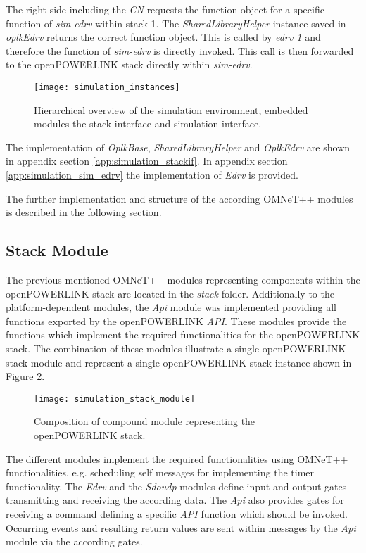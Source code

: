 The right side including the \emph{CN} requests the function object for a specific function of \emph{sim-edrv} within stack 1.
The \emph{SharedLibraryHelper} instance saved in \emph{oplkEdrv} returns the correct function object.
This is called by \emph{edrv 1} and therefore the function of \emph{sim-edrv} is directly invoked.
This call is then forwarded to the openPOWERLINK stack directly within \emph{sim-edrv}.

\begin{figure}
    \centering
    \texttt{[image: simulation\_instances]}
    \caption{Hierarchical overview of the simulation environment, embedded modules the stack interface and simulation interface.}
    \label{fig:simulation_instances}
\end{figure}

The implementation of \emph{OplkBase}, \emph{SharedLibraryHelper} and \emph{OplkEdrv} are shown in appendix section \ref{app:simulation_stackif}.
In appendix section \ref{app:simulation_sim_edrv} the implementation of \emph{Edrv} is provided.

The further implementation and structure of the according OMNeT++ modules is described in the following section.

\subsection{Stack Module}
\label{sec:porting_stack_stackmodule}

The previous mentioned OMNeT++ modules representing components within the openPOWERLINK stack are located in the \emph{stack} folder.
Additionally to the platform-dependent modules, the \emph{Api} module was implemented providing all functions exported by the openPOWERLINK \emph{API}.
These modules provide the functions which implement the required functionalities for the openPOWERLINK stack.
The combination of these modules illustrate a single openPOWERLINK stack module and represent a single openPOWERLINK stack instance shown in Figure \ref{fig:simulation_stack_module}.

\begin{figure}
    \centering
    \texttt{[image: simulation\_stack\_module]}
    \caption{Composition of compound module representing the openPOWERLINK stack.}
    \label{fig:simulation_stack_module}
\end{figure}

\begin{sloppypar}
The different modules implement the required functionalities using OMNeT++ functionalities, e.g. scheduling self messages for implementing the timer functionality.
The \emph{Edrv} and the \emph{Sdoudp} modules define input and output gates transmitting and receiving the according data.
The \emph{Api} also provides gates for receiving a command defining a specific \emph{API} function which should be invoked.
Occurring events and resulting return values are sent within messages by the \emph{Api} module via the according gates.
\end{sloppypar}

